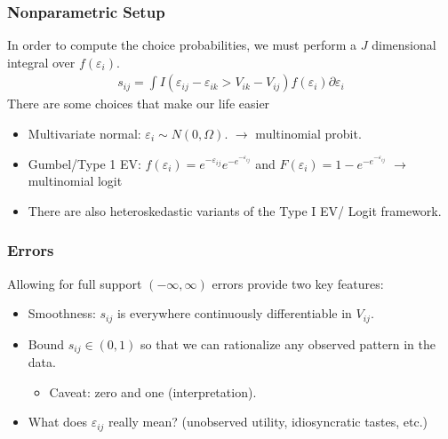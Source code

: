 \begin{frame}
\frametitle{Nonparametric Setup}
In order to compute the choice probabilities, we must perform a $J$ dimensional integral over $f(\varepsilon_i)$.
\begin{align*}
s_{ij} =  \int I( \varepsilon_{ij}-\varepsilon_{ik} > V_{ik} - V_{ij} ) f( \varepsilon_i) \partial \varepsilon_i
\end{align*}
There are some choices that make our life easier
\begin{itemize}
\item Multivariate normal: $\varepsilon_i  \sim N(0,\Omega)$. $\longrightarrow$ \alert{ multinomial probit}.
\item Gumbel/Type 1 EV: $f(\varepsilon_i) = e^{-\varepsilon_{ij}}  e^{-e^{-\varepsilon_{ij}}}  $ and $F(\varepsilon_i) = 1- e^{-e^{-\varepsilon_{ij}}}$ $\longrightarrow$ \alert{multinomial logit}
\item There are also heteroskedastic variants of the Type I EV/ Logit framework.
\end{itemize}
\end{frame}

\begin{frame}
\frametitle{Errors}
Allowing for full support $(-\infty, \infty)$ errors provide two key features:
\begin{itemize}
\item Smoothness: $s_{ij}$ is everywhere continuously differentiable in $V_{ij}$.
\item Bound $s_{ij} \in (0,1)$ so that we can rationalize any observed pattern in the data.
\begin{itemize}
\item Caveat: zero and one (interpretation).
\end{itemize}
\item What does $\varepsilon_{ij}$ really mean? (unobserved utility, idiosyncratic tastes, etc.)
\end{itemize}
\end{frame}

